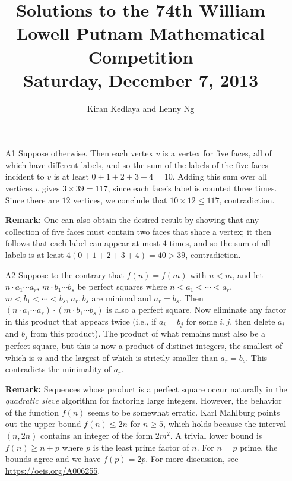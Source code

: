 \documentclass[amssymb,twocolumn,pra,10pt,aps]{revtex4-1}
\begin{document}
\title{Solutions to the 74th William Lowell Putnam Mathematical Competition \\
    Saturday, December 7, 2013}
\author{Kiran Kedlaya and Lenny Ng}
\noaffiliation
\maketitle

\begin{itemize}
\item[A1]
Suppose otherwise. Then each vertex $v$ is a vertex for five faces, all of which have different labels, and so the sum of the labels of the five faces incident to $v$ is at least $0+1+2+3+4 = 10$. Adding this sum over all vertices $v$ gives $3 \times 39 = 117$, since each face's label is counted three times. Since there are $12$ vertices, we conclude that $10 \times 12 \leq 117$, contradiction.

\noindent
\textbf{Remark:}
One can also obtain the desired result by showing that any collection of five faces must contain two faces that share a vertex; it then follows that each label can appear at most $4$ times, and so the sum of all labels is at least $4(0+1+2+3+4) = 40 > 39$, contradiction.

\item[A2]
Suppose to the contrary that $f(n) = f(m)$ with $n<m$, and let $n\cdot a_1\cdots a_r$, $m\cdot b_1\cdots b_s$ be perfect squares where $n < a_1 < \cdots < a_r$, $m < b_1 < \cdots < b_s$, $a_r,b_s$ are minimal and $a_r=b_s$. Then $(n\cdot a_1\cdots a_r)\cdot (m\cdot b_1\cdots b_s)$ is also a perfect square. Now eliminate any factor in this product that appears twice (i.e., if $a_i = b_j$ for some $i,j$, then delete $a_i$ and $b_j$ from this product). The product of what remains must also be a perfect square, but this is now a product of distinct integers, the smallest of which is $n$ and the largest of which is strictly smaller than $a_r = b_s$. This contradicts the minimality of $a_r$.

\noindent
\textbf{Remark:}
Sequences whose product is a perfect square occur naturally in the \emph{quadratic sieve} algorithm for factoring large integers. However,
the behavior of the function $f(n)$ seems to be somewhat erratic. 
Karl Mahlburg points out the upper bound $f(n) \leq 2n$ for $n \geq 5$, which holds because the interval $(n, 2n)$ contains an integer of the form $2m^2$. A trivial lower bound is $f(n) \geq n+p$ where $p$ is the least prime factor of $n$. For $n = p$ prime, the bounds agree and we have $f(p) = 2p$. For more discussion, see 
\url{https://oeis.org/A006255}.


\end{itemize}
\end{document}

